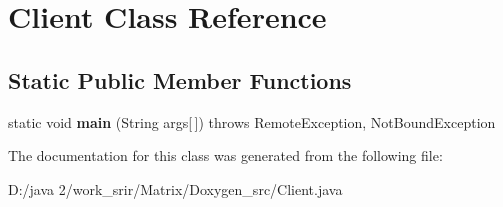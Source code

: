 \hypertarget{class_client}{}\section{Client Class Reference}
\label{class_client}
\subsection*{Static Public Member Functions}
\begin{DoxyCompactItemize}
\item 
\hypertarget{class_client_ac4219c51358857184ceeb023ada3d8ae}{}static void {\bfseries main} (String args\mbox{[}$\,$\mbox{]})  throws Remote\+Exception, 			\+Not\+Bound\+Exception \label{class_client_ac4219c51358857184ceeb023ada3d8ae}

\end{DoxyCompactItemize}


The documentation for this class was generated from the following file\+:\begin{DoxyCompactItemize}
\item 
D\+:/java 2/work\+\_\+srir/\+Matrix/\+Doxygen\+\_\+src/Client.\+java\end{DoxyCompactItemize}
